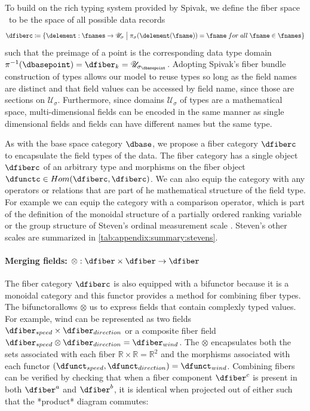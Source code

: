 \documentclass[journal]{IEEEtran}
\theoremstyle{definition}
\theoremstyle{remark}
\begin{document}
To build on the rich typing system provided by Spivak, we define the \textcolor{fiber}{fiber space} \dfiberc\ to be the space of all possible data records
\begin{equation}
  \dfiberc \coloneqq \{\delement: \fnames \rightarrow \mathscr{U}_{\sigma} \bigm{\vert} \pi_{\sigma}(\delement(\fname)) = \fname\;for\;all\; \fname \in \fnames \}
\end{equation}
such that the preimage of a point is the corresponding data type domain $\pi^{-1}(\dbasepoint) = \dfiber_{k} = \mathscr{U}_{{\sigma}_{\dbasepoint}}$.
Adopting Spivak's fiber bundle construction of types allows our model to reuse types so long as the field names are distinct and that field values can be accessed by field name,  since those are sections on $\mathcal{U}_{\sigma}$. Furthermore, since domains $\mathscr{U}_{{\sigma}}$ of types are a mathematical space, multi-dimensional fields can be encoded in the same manner as single dimensional fields and fields can have different names but the same type.

As with the base space category $\mathcal{\dbase}$, we propose a fiber category $\mathcal{\dfiberc}$ to encapsulate the field types of the data. The fiber category has a single object $\dfiberc$ of an arbitrary type and morphisms on the fiber object $\dfunctc \in Hom(\dfiberc, \dfiberc)$. We can also equip the category with any operators or relations that are part of he mathematical structure of the field type. For example we can equip the category with a comparison operator, which is part of the definition of the monoidal structure of a partially ordered ranking variable \cite{bruggemannRankingPrioritizationMultiindicator2011} or the group structure of Steven's ordinal measurement scale \cite{stevensTheoryScalesMeasurement1946, leaFormalizationMeasurementScale1971, thomasMathematizationNotMeasurement2014}. Steven's other scales are summarized in \autoref{tab:appendix:summary:stevens}.

\paragraph{Merging fields: $\otimes: \mathcal{\dfiber} \times \mathcal{\dfiber} \rightarrow \mathcal{\dfiber}$ }

The fiber category $\mathcal{\dfiberc}$ is also equipped with a bifunctor because it is a monoidal category and this functor provides a method for combining fiber types. The bifunctorallows $\otimes$ us to express fields that contain complexly typed values. For example, wind can be represented as two fields $\dfiber_{speed} \times \dfiber_{direction}$ or a composite fiber field $\dfiber_{speed} \otimes \dfiber_{direction} = \dfiber_{wind}$. The $\otimes$ encapsulates both the sets associated with each fiber $\mathbb{R} \times \mathbb{R} = \mathbb{R}^{2}$ and the morphisms associated with each functor $(\dfunct_{speed}, \dfunct_{direction}) = \dfunct_{wind}$. Combining fibers can be verified by checking that when a fiber component $\dfiber^{c}$ is present in both $\dfiber^{a}$ and $\dfiber^{b}$, it is identical when projected out of either such that the *product* diagram commutes:
\end{document}
